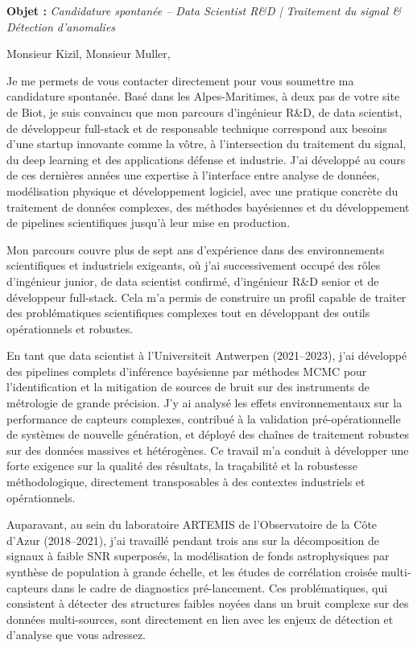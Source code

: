 \documentclass[11pt,a4paper]{../_shared/altacv}
\begin{document}
\makecvheader


{\color{accent}\textbf{Objet :}} \textit{Candidature spontanée -- Data Scientist R\&D | Traitement du signal \& Détection d'anomalies}

{\color{body}

Monsieur Kizil, Monsieur Muller,

Je me permets de vous contacter directement pour vous soumettre ma candidature spontanée. Basé dans les Alpes-Maritimes, à deux pas de votre site de Biot, je suis convaincu que mon parcours d’ingénieur R\&D, de data scientist, de développeur full-stack et de responsable technique correspond aux besoins d’une startup innovante comme la vôtre, à l’intersection du traitement du signal, du deep learning et des applications défense et industrie. J’ai développé au cours de ces dernières années une expertise à l’interface entre analyse de données, modélisation physique et développement logiciel, avec une pratique concrète du traitement de données complexes, des méthodes bayésiennes et du développement de pipelines scientifiques jusqu’à leur mise en production.

Mon parcours couvre plus de sept ans d’expérience dans des environnements scientifiques et industriels exigeants, où j’ai successivement occupé des rôles d’ingénieur junior, de data scientist confirmé, d’ingénieur R\&D senior et de développeur full-stack. Cela m’a permis de construire un profil capable de traiter des problématiques scientifiques complexes tout en développant des outils opérationnels et robustes.

En tant que data scientist à l’Universiteit Antwerpen (2021--2023), j’ai développé des pipelines complets d’inférence bayésienne par méthodes MCMC pour l’identification et la mitigation de sources de bruit sur des instruments de métrologie de grande précision. J’y ai analysé les effets environnementaux sur la performance de capteurs complexes, contribué à la validation pré-opérationnelle de systèmes de nouvelle génération, et déployé des chaînes de traitement robustes sur des données massives et hétérogènes. Ce travail m’a conduit à développer une forte exigence sur la qualité des résultats, la traçabilité et la robustesse méthodologique, directement transposables à des contextes industriels et opérationnels.

Auparavant, au sein du laboratoire ARTEMIS de l’Observatoire de la Côte d’Azur (2018--2021), j’ai travaillé pendant trois ans sur la décomposition de signaux à faible SNR superposés, la modélisation de fonds astrophysiques par synthèse de population à grande échelle, et les études de corrélation croisée multi-capteurs dans le cadre de diagnostics pré-lancement. Ces problématiques, qui consistent à détecter des structures faibles noyées dans un bruit complexe sur des données multi-sources, sont directement en lien avec les enjeux de détection et d’analyse que vous adressez.

}
\end{document}
